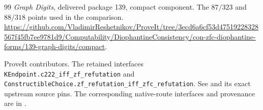 \documentclass[11pt,letterpaper]{article}
\theoremstyle{definition}
\theoremstyle{remark}
\begin{document}
\begin{thebibliography}{99}
\emph{Graph Digits}, delivered package 139, compact component.
The $87/323$ and $88/318$ points used in the comparison.
\url{https://github.com/VladimirReshetnikov/ProveIt/tree/3ecd6a6cf53d47519228328567f45fb7ee9781d9/Computability/DiophantineConsistency/con-zfc-diophantine-forms/139-graph-digits/compact}.

ProveIt contributors. The retained interfaces
\texttt{KEndpoint.c222\_iff\_zf\_refutation} and
\texttt{ConstructibleChoice.zf\_refutation\_iff\_zfc\_refutation}.
See 
and its exact upstream source pins.  The corresponding native-route
interfaces and provenance are in .
\end{thebibliography}
\end{document}
